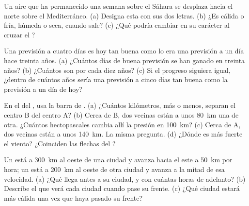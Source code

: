 \begin{exercise}[$\star\star$]\label{exo:g8:fronts-and-weather-maps:9}
Un aire que ha permanecido una semana sobre el Sáhara se desplaza hacia el
norte sobre el  Mediterráneo. (a) Designa esta  con sus dos
letras. (b) ¿Es cálida o fría, húmeda o seca, cuando sale? (c) ¿Qué podría
cambiar en su carácter al cruzar el ?
\end{exercise}

\begin{exercise}[$\star\star$]\label{exo:g8:fronts-and-weather-maps:10}
Una previsión a cuatro días es hoy tan buena como lo era una previsión a
un día hace treinta años. (a) ¿Cuántos días de buena previsión se han
ganado en treinta años? (b) ¿Cuántos son por cada diez años? (c) Si el
progreso siguiera igual, ¿dentro de cuántos años sería una previsión a
cinco días tan buena como la previsión a un día de hoy?
\end{exercise}

\begin{exercise}[$\star\star\star$]\label{exo:g8:fronts-and-weather-maps:11}
En el  del , usa la barra de . (a) ¿Cuántos kilómetros,
más o menos, separan el centro B del centro A? (b) Cerca de B, dos
 vecinas están a unos \qty{80}{km} una de otra. ¿Cuántos
hectopascales cambia allí la presión en \qty{100}{km}? (c) Cerca de A, dos
 vecinas están a unos \qty{140}{km}. La misma pregunta. (d) ¿Dónde
es más fuerte el viento? ¿Coinciden las flechas del ?
\end{exercise}

\begin{exercise}[$\star\star\star$]\label{exo:g8:fronts-and-weather-maps:12}
Un  está a \qty{300}{km} al oeste de una ciudad y avanza hacia
el este a \qty{50}{km} por hora; un  está a \qty{200}{km} al
oeste de otra ciudad y avanza a la mitad de esa velocidad. (a) ¿Qué 
llega antes a su ciudad, y con cuántas horas de adelanto? (b) Describe el
 que verá cada ciudad cuando pase su frente. (c) ¿Qué ciudad estará
más cálida una vez que haya pasado su frente?
\end{exercise}

